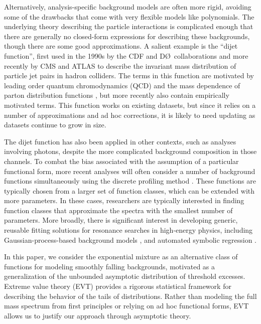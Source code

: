 \documentclass[a4paper,11pt]{article}
\begin{document}
Alternatively, analysis-specific background models are often more rigid, avoiding some of the drawbacks that 
come with very flexible models like polynomials. The underlying theory describing the particle 
interactions is complicated enough that there are generally no closed-form expressions for 
describing these backgrounds, though there are some good approximations. A salient example is 
the ``dijet function'', first used in the 1990s by the CDF and D\O\ collaborations and more 
recently by CMS and ATLAS \cite{Harris:2011bh} to describe the invariant mass distribution of 
particle jet pairs in hadron colliders. The terms in this function are motivated by leading 
order quantum chromodynamics (QCD) and the mass dependence of parton distribution 
functions \cite{Harris:2011bh}, but more recently also contain empirically motivated terms. This function works on existing datasets, but 
since it relies on a number of approximations and ad hoc corrections, it is likely to need 
updating as datasets continue to grow in size.

The dijet function has also been applied in other contexts, such as analyses 
involving photons, despite the more complicated background composition 
in those channels. To combat the bias associated 
with the assumption of a particular functional form, more recent analyses \cite{CMS_DP1, 
CMS_high_mass_diphoton, CMS_DP2, CMS_DP3} will often consider a number of background functions 
simultaneously using the discrete profiling method \cite{discrete-profiling}. These functions 
are typically chosen from a larger set of function classes, which can be extended with more 
parameters. In these cases, researchers are typically interested in finding function classes that 
approximate the spectra with the smallest number of parameters. More broadly, there is significant interest in developing generic, 
reusable fitting solutions for resonance searches in high-energy physics, including 
Gaussian-process-based background models \cite{Frate_2017}, and automated symbolic regression \cite{SymbolFit_2025}.

In this paper, we consider the exponential mixture as an alternative class of functions for modeling 
smoothly falling backgrounds, motivated as a generalization of the unbounded asymptotic 
distribution of threshold excesses. Extreme value theory (EVT) provides a rigorous statistical 
framework for describing the behavior of the tails of distributions. Rather than modeling the 
full mass spectrum from first principles or relying on ad hoc functional forms, EVT allows us to 
justify our approach through asymptotic theory.
\end{document}
